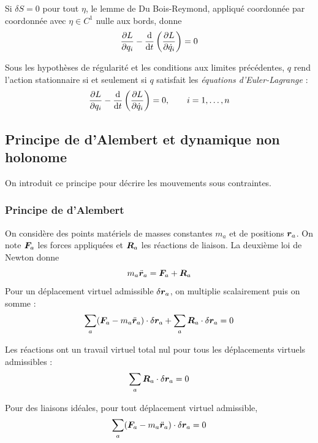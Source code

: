 Si $\delta S = 0$ pour tout $\eta$, le lemme de Du Bois-Reymond,
appliqué coordonnée par coordonnée avec $\eta\in C^1$ nulle aux bords,
donne
\[
    \frac{\partial L}{\partial q_i} - \frac{\mathrm{d}}{\mathrm{d} t}\left(\frac{\partial L}{\partial \dot q_i}\right) = 0
\]

\begin{theoreme}
    Sous les hypothèses de régularité et les conditions aux limites
    précédentes, $q$ rend l'action stationnaire si et seulement si $q$
    satisfait les \emph{équations d'Euler-Lagrange} :
    \[
        \frac{\partial L}{\partial q_i} - \frac{\mathrm{d}}{\mathrm{d} t}\left(\frac{\partial L}{\partial \dot q_i}\right) = 0,
        \qquad i = 1,\dots,n
    \]
\end{theoreme}

\subsection{Principe de d'Alembert et dynamique non holonome}

On introduit ce principe pour décrire les mouvements sous
contraintes.

\subsubsection{Principe de d'Alembert}

On considère des points matériels de masses constantes $m_a$ et de
positions $\bm{r}_a$. On note $\bm{F}_a$ les forces appliquées et
$\bm{R}_a$ les réactions de liaison. La deuxième loi de Newton donne
\[
    m_a\ddot{\bm{r}}_a = \bm{F}_a + \bm{R}_a
\]
Pour un déplacement virtuel admissible $\delta\bm{r}_a$, on
multiplie scalairement puis on somme :
\[
    \sum_a(\bm{F}_a - m_a\ddot{\bm{r}}_a)\cdot\delta\bm{r}_a
    + \sum_a\bm{R}_a\cdot\delta\bm{r}_a = 0
\]

\begin{hypotheses}
    Les réactions ont un travail virtuel total nul pour tous les
    déplacements virtuels admissibles :
    \[
        \sum_a\bm{R}_a\cdot\delta\bm{r}_a = 0
    \]
\end{hypotheses}

\begin{theoreme}
    Pour des liaisons idéales, pour tout déplacement virtuel
    admissible,
    \[
        \sum_a(\bm{F}_a - m_a\ddot{\bm{r}}_a)\cdot
        \delta\bm{r}_a = 0
    \]
\end{theoreme}

